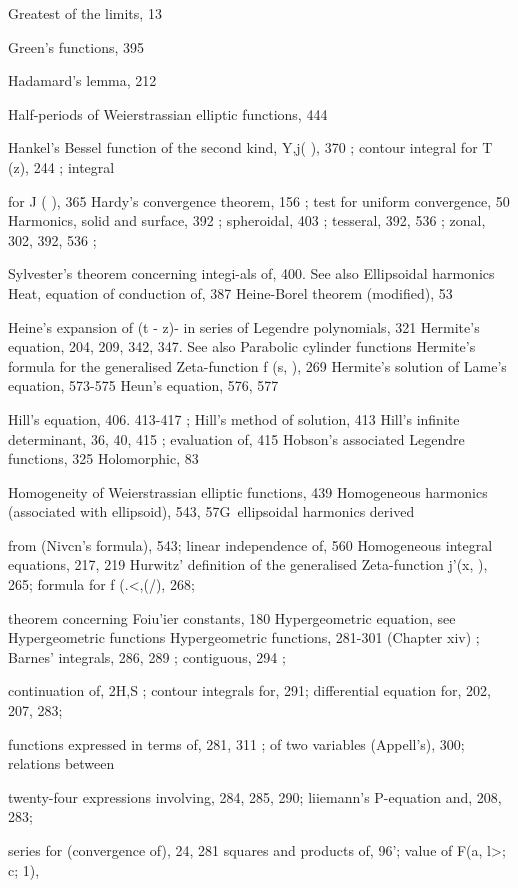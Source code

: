 Greatest of the limits, 13

Green's functions, 395

Hadamard's lemma, 212

Half-periods of Weierstrassian elliptic functions, 444

Hankel's Bessel function of the second kind, Y,j( ), 370 ; contour integral for T (z), 244 ; integral

for J ( ), 365
Hardy's convergence theorem, 156 ; test for uniform convergence, 50
Harmonics, solid and surface, 392 ; spheroidal, 403 ; tesseral, 392, 536 ; zonal, 302, 392, 536 ;

Sylvester's theorem concerning integi-als of, 400. See also Ellipsoidal harmonics
Heat, equation of conduction of, 387
Heine-Borel theorem (modified), 53

Heine's expansion of (t - z)-  in series of Legendre polynomials, 321
Hermite's equation, 204, 209, 342, 347. See also Parabolic cylinder functions
Hermite's formula for the generalised Zeta-function f (s,  ), 269
Hermite's solution of Lame's equation, 573-575
Heun's equation, 576, 577

Hill's equation, 406. 413-417 ; Hill's method of solution, 413
Hill's infinite determinant, 36, 40, 415 ; evaluation of, 415
Hobson's associated Legendre functions, 325
Holomorphic, 83

Homogeneity of Weierstrassian elliptic functions, 439
Homogeneous harmonics (associated with ellipsoid), 543, 57G\ ellipsoidal harmonics derived

from (Nivcn's formula), 543; linear independence of, 560
Homogeneous integral equations, 217, 219
Hurwitz' definition of the generalised Zeta-function j'(x,  ), 265; formula for f (.<,(/), 268;

theorem concerning Foiu'ier constants, 180
Hypergeometric equation, see Hypergeometric functions
Hypergeometric functions, 281-301 (Chapter xiv) ; Barnes' integrals, 286, 289 ; contiguous, 294 ;

continuation of, 2H,S ; contour integrals for, 291; differential equation for, 202, 207, 283;

functions expressed in terms of, 281, 311 ; of two variables (Appell's), 300; relations between

twenty-four expressions involving, 284, 285, 290; liiemann's P-equation and, 208, 283;

series for (convergence of), 24, 281 squares and products of,  96'; value of F(a, l>; c; 1),

%
%

